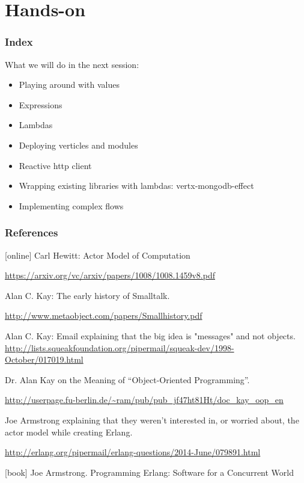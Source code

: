 \documentclass{beamer}
\begin{document}
\section{Hands-on}

\begin{frame}
\frametitle{Index}
What we will do in the next session:
\begin{itemize}
\item<1->  Playing around with values
\item<2->  Expressions
\item<3->  Lambdas
\item<4->  Deploying verticles and modules
\item<5->  Reactive http client
\item<6->  Wrapping existing libraries with lambdas: vertx-mongodb-effect
\item<7->  Implementing complex flows
\end{itemize}
\end{frame}


\begin{frame}[t, allowframebreaks]
\frametitle{References}
\begin{thebibliography}{9}

[online]
Carl Hewitt: Actor Model of Computation

\url{https://arxiv.org/vc/arxiv/papers/1008/1008.1459v8.pdf}

Alan C. Kay: The early history of Smalltalk.

\url{http://www.metaobject.com/papers/Smallhistory.pdf}


Alan C. Kay: Email explaining that the big idea is "messages" and not objects.
\url{http://lists.squeakfoundation.org/pipermail/squeak-dev/1998-October/017019.html}

Dr. Alan Kay on the Meaning of “Object-Oriented Programming”.

\url{http://userpage.fu-berlin.de/~ram/pub/pub_jf47ht81Ht/doc_kay_oop_en}

Joe Armstrong explaining that they weren't interested in, or worried about, the actor model while creating Erlang.

\url{http://erlang.org/pipermail/erlang-questions/2014-June/079891.html}

[book]
Joe Armstrong. Programming Erlang: Software for a Concurrent World

\end{thebibliography}
\end{frame}
\end{document}
